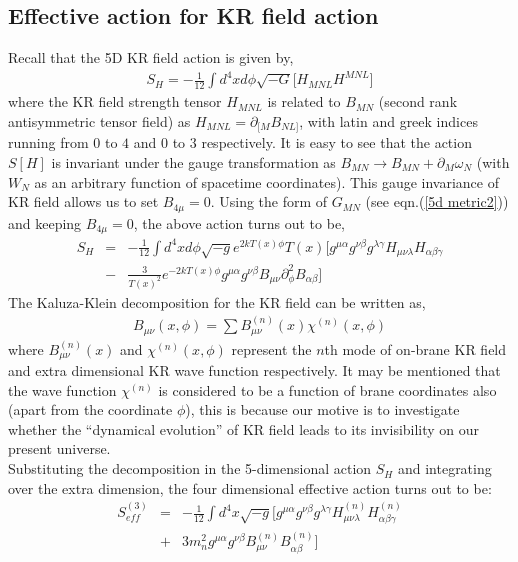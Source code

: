 \documentclass[a4paper]{article}
\begin{document}
\subsection{Effective action for KR field action}
Recall that the 5D KR field action is given by,
\begin{eqnarray}
 S_{H} = -\frac{1}{12}\int d^4xd\phi \sqrt{-G}\bigg[H_{MNL}H^{MNL}\bigg]
 \label{KR action1}
\end{eqnarray}
where the KR field strength tensor $H_{MNL}$ is related to $B_{MN}$ (second rank antisymmetric tensor field) as 
$H_{MNL} = \partial_{[M}B_{NL]}$, 
with latin and greek indices running from $0$ to $4$ and $0$ to $3$ respectively. 
It is easy to see that the action $S[H]$ is invariant under the gauge 
transformation as $B_{MN} \rightarrow B_{MN}+\partial_{M}\omega_{N}$ (with $W_{N}$ as an arbitrary function of spacetime coordinates). This gauge 
invariance of KR field allows us to set $B_{4\mu} = 0$. Using the form of $G_{MN}$ (see eqn.(\ref{5d metric2})) and keeping $B_{4\mu}=0$, the 
above action turns out to be,
\begin{eqnarray}
 S_{H}&=&-\frac{1}{12} \int d^4xd\phi \sqrt{-g}e^{2kT(x)\phi}T(x) 
 \bigg[g^{\mu\alpha}g^{\nu\beta}g^{\lambda\gamma}H_{\mu\nu\lambda}H_{\alpha\beta\gamma}\nonumber\\
 &-&\frac{3}{T(x)^2}e^{-2kT(x)\phi}g^{\mu\alpha}g^{\nu\beta}B_{\mu\nu}\partial_{\phi}^2B_{\alpha\beta}\bigg]
 \label{KR action2}
\end{eqnarray}
The Kaluza-Klein decomposition for the KR field can be written as,
\begin{eqnarray}
 B_{\mu\nu}(x,\phi) = \sum B_{\mu\nu}^{(n)}(x)\chi^{(n)}(x,\phi)
 \label{KR decompose}
\end{eqnarray}
where $B_{\mu\nu}^{(n)}(x)$ and $\chi^{(n)}(x,\phi)$ represent the $n$th mode of on-brane KR field and extra dimensional 
KR wave function respectively. It may be mentioned that the wave function $\chi^{(n)}$ 
is considered to be a function of brane coordinates also (apart from the coordinate $\phi$), this is because our motive 
is to investigate whether the ``dynamical evolution'' of KR field leads to its invisibility on our present universe.\\
Substituting the decomposition in the 5-dimensional action $S_{H}$ and integrating over the extra dimension, 
the four dimensional effective action turns out to be:
\begin{eqnarray}
 S_{eff}^{(3)}&=&-\frac{1}{12} \int d^4x \sqrt{-g}
 \bigg[g^{\mu\alpha}g^{\nu\beta}g^{\lambda\gamma}H_{\mu\nu\lambda}^{(n)}H_{\alpha\beta\gamma}^{(n)}\nonumber\\
 &+&3m_n^2 g^{\mu\alpha}g^{\nu\beta}B_{\mu\nu}^{(n)}B_{\alpha\beta}^{(n)}\bigg]
 \label{effective action3}
\end{eqnarray}
\end{document}
